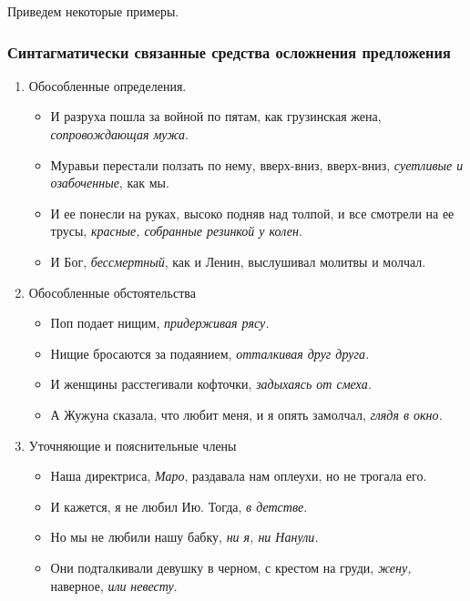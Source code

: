 \documentclass{kursa4}
\begin{document}
{        Приведем некоторые примеры.

        \subsubsection{Синтагматически связанные средства осложнения предложения}

          \begin{enumerate}
            \item Обособленные определения.
            \begin{itemize}
              \item И разруха пошла за войной по пятам, как грузинская жена, \textit{сопровождающая мужа}.
              \item Муравьи перестали ползать по нему, вверх-вниз, вверх-вниз, \textit{суетливые и озабоченные}, как мы.
              \item И ее понесли на руках, высоко подняв над толпой,
              и все смотрели на ее трусы, \textit{красные,
              собранные резинкой у колен}.
              \item И Бог, \textit{бессмертный}, как и Ленин, выслушивал молитвы и молчал.
            \end{itemize}

            \item Обособленные обстоятельства
            \begin{itemize}
              \item Поп подает нищим, \textit{придерживая рясу.}
              \item Нищие бросаются за подаянием, \textit{отталкивая друг друга.}
              \item И женщины расстегивали кофточки, \textit{задыхаясь от смеха.}
              \item А Жужуна сказала, что любит меня, и я опять замолчал,\textit{
              глядя в окно.}
            \end{itemize}

            \item Уточняющие и пояснительные члены
            \begin{itemize}
              \item Наша директриса, \textit{Маро}, раздавала нам оплеухи, но не
              трогала его.
              \item И кажется, я не любил Ию. Тогда, \textit{в детстве}.
              \item Но мы не любили нашу бабку, \textit{ни я, ни Нанули.}
              \item Они подталкивали девушку в черном, с крестом на груди, \textit{жену,} наверное, \textit{или} \textit{невесту}.
            \end{itemize}
        

\end{enumerate}}
\end{document}

